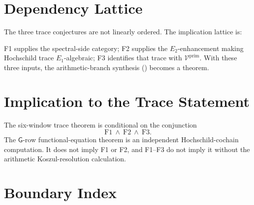 \section{Dependency Lattice}
\label{v4-arith:of:dependency-graph}

The three trace conjectures are not linearly ordered. The implication
lattice is:
\begin{center}
\end{center}
F1 supplies the spectral-side category; F2 supplies the
\(E_{2}\)-enhancement making Hochschild trace \(E_{1}\)-algebraic; F3
identifies that trace with \(\mathcal{V}^{\mathrm{prim}}\). With these
three inputs, the arithmetic-branch synthesis
() becomes a theorem.

\section{Implication to the Trace Statement}
\label{v4-arith:of:chain-of-implications}

The six-window trace theorem is conditional on the conjunction
\[
\mathrm{F1}\ \wedge\ \mathrm{F2}\ \wedge\ \mathrm{F3}.
\]
The \(\mathsf{G}\)-row functional-equation theorem
 is an
independent Hochschild-cochain computation. It does not imply F1 or
F2, and F1--F3 do not imply it without the arithmetic
Koszul-resolution calculation.

\section{Boundary Index}
\label{v4-arith:of:summary}

